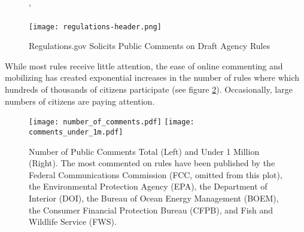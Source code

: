 \begin{figure}'
    \centering
    \caption{Regulations.gov Solicits Public Comments on Draft Agency Rules}
    \label{fig:regs.gov}
    \texttt{[image: regulations-header.png]}
\end{figure}

While most rules receive little attention, the ease of online commenting and mobilizing has created exponential increases in the number of rules where which hundreds of thousands of citizens participate (see figure \ref{fig:comments}). Occasionally, large numbers of citizens are paying attention.

\begin{figure}[!hb]
\caption{Number of Public Comments Total (Left) and Under 1 Million (Right). The most commented on rules have been published by the Federal Communications Commission (FCC, omitted from this plot), the Environmental Protection Agency (EPA), the Department of Interior (DOI), the Bureau of Ocean Energy Management (BOEM), the Consumer Financial Protection Bureau (CFPB), and Fish and Wildlife Service (FWS).}
\texttt{[image: number\_of\_comments.pdf]}
\texttt{[image: comments\_under\_1m.pdf]}
\label{fig:comments}
\end{figure}



